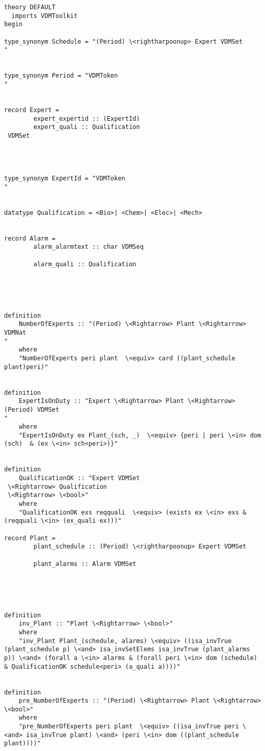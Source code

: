 \begin{lstlisting}[language=Isabelle]
theory DEFAULT
  imports VDMToolkit
begin

type_synonym Schedule = "(Period) \<rightharpoonup> Expert VDMSet
"


type_synonym Period = "VDMToken
"


record Expert =
        expert_expertid :: (ExpertId)
        expert_quali :: Qualification
 VDMSet

    


type_synonym ExpertId = "VDMToken
"


datatype Qualification = <Bio>| <Chem>| <Elec>| <Mech>


record Alarm =
        alarm_alarmtext :: char VDMSeq

        alarm_quali :: Qualification

    



definition
	NumberOfExperts :: "(Period) \<Rightarrow> Plant \<Rightarrow> VDMNat
"
    where
    "NumberOfExperts peri plant  \<equiv> card ((plant_schedule plant)peri)"


definition
	ExpertIsOnDuty :: "Expert \<Rightarrow> Plant \<Rightarrow> (Period) VDMSet
"
    where
    "ExpertIsOnDuty ex Plant_(sch, _)  \<equiv> {peri | peri \<in> dom (sch)  & (ex \<in> sch<peri>)}"


definition
	QualificationOK :: "Expert VDMSet
 \<Rightarrow> Qualification
 \<Rightarrow> \<bool>"
    where
    "QualificationOK exs reqquali  \<equiv> (exists ex \<in> exs & (reqquali \<in> (ex_quali ex)))"

record Plant =
        plant_schedule :: (Period) \<rightharpoonup> Expert VDMSet

        plant_alarms :: Alarm VDMSet

    



definition
	inv_Plant :: "Plant \<Rightarrow> \<bool>"
    where
    "inv_Plant Plant_(schedule, alarms) \<equiv> ((isa_invTrue (plant_schedule p) \<and> isa_invSetElems isa_invTrue (plant_alarms p)) \<and> (forall a \<in> alarms & (forall peri \<in> dom (schedule) & QualificationOK schedule<peri> (a_quali a))))"


definition
	pre_NumberOfExperts :: "(Period) \<Rightarrow> Plant \<Rightarrow> \<bool>"
    where
    "pre_NumberOfExperts peri plant  \<equiv> ((isa_invTrue peri \<and> isa_invTrue plant) \<and> (peri \<in> dom ((plant_schedule plant))))"



\end{lstlisting}
